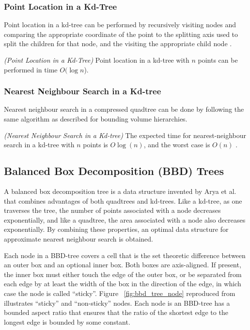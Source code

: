 \documentclass[mcs]{scsthesis}
\begin{document}
\subsubsection{Point Location in a Kd-Tree}

Point location in a kd-tree can be performed by recursively visiting nodes and
comparing the appropriate coordinate of the point to the splitting axis used
to split the children for that node, and the visiting the appropriate child
node \cite{kdtree}.

\begin{thm} \emph{(Point Location in a Kd-Tree)} 
Point location in a kd-tree with $n$ points can be performed in time
\(O(\log n\)). 
\end{thm}

\subsubsection{Nearest Neighbour Search in a Kd-tree}

Nearest neighbour search in a compressed quadtree can be done by following the
same algorithm as described for bounding volume hierarchies.

\begin{thm} \emph{(Nearest Neighbour Search in a Kd-tree)} 
The expected time for nearest-neighbour search in a kd-tree with $n$ points is
\(O \log(n)\), and the worst case is \(O(n)\) \cite{friedman}.
\end{thm}

\subsection{Balanced Box Decomposition (BBD) Trees}

A balanced box decomposition tree is a data structure invented by Arya et al.
\cite{optimalann} that combines advantages of both quadtrees and kd-trees.
Like a kd-tree, as one traverses the tree, the number of points associated with
a node decreases exponentially, and like a quadtree, the area associated with a
node also decreases exponentially. By combining these properties, an optimal
data structure for approximate nearest neighbour search is obtained.

Each node in a BBD-tree covers a cell that is the set theoretic difference
between an outer box and an optional inner box. Both boxes are axis-aligned.
If present, the inner box must either touch the edge of the outer box, or be
separated from each edge by at least the width of the box in the direction of
the edge, in which case the node is called ``sticky''. Figure
~\ref{fig:bbd_tree_node} reproduced from \cite{optimalann} illustrates
``sticky'' and ``non-sticky'' nodes. Each node is an BBD-tree has a bounded
aspect ratio that ensures that the ratio of the shortest edge to the longest
edge is bounded by some constant.
\end{document}
